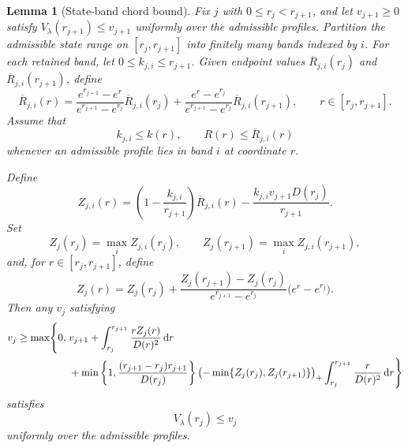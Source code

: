 \documentclass[11pt]{article}
\newtheorem{lemma}[theorem]{Lemma}
\theoremstyle{definition}
\theoremstyle{remark}
\newcommand{\dd}{\,\mathrm d}
\begin{document}
\begin{lemma}[State-band chord bound]
\label{lem:cert-dp-chord}
Fix $j$ with $0\le r_j<r_{j+1}$, and let $v_{j+1}\ge0$
satisfy $V_\lambda(r_{j+1})\le v_{j+1}$ uniformly over the
admissible profiles.  Partition the admissible state range on
$[r_j,r_{j+1}]$ into finitely many bands indexed by $i$.
For each retained band, let $0\le k_{j,i}\le r_{j+1}$.
Given endpoint values $\overline R_{j,i}(r_j)$ and
$\overline R_{j,i}(r_{j+1})$, define
\[
 \overline R_{j,i}(r)
 =\frac{e^{r_{j+1}}-e^r}{e^{r_{j+1}}-e^{r_j}}
   \overline R_{j,i}(r_j)
 +\frac{e^r-e^{r_j}}{e^{r_{j+1}}-e^{r_j}}
   \overline R_{j,i}(r_{j+1}),
 \qquad r\in[r_j,r_{j+1}].
\]
Assume that
\[
 k_{j,i}\le k(r),\qquad R(r)\le\overline R_{j,i}(r)
\]
whenever an admissible profile lies in band $i$ at coordinate $r$.

Define
\begin{equation}\label{eq:cert-generic-dp-chord}
 Z_{j,i}(r)
 =
 \left(1-\frac{k_{j,i}}{r_{j+1}}\right)
 \overline R_{j,i}(r)
 -
 \frac{k_{j,i}v_{j+1}D(r_j)}{r_{j+1}}.
\end{equation}
Set
\[
 Z_j(r_j)=\max_iZ_{j,i}(r_j),
 \qquad
 Z_j(r_{j+1})=\max_iZ_{j,i}(r_{j+1}),
\]
and, for $r\in[r_j,r_{j+1}]$, define
\[
 Z_j(r)
 =
 Z_j(r_j)
 +
 \frac{Z_j(r_{j+1})-Z_j(r_j)}
      {e^{r_{j+1}}-e^{r_j}}
 \bigl(e^r-e^{r_j}\bigr).
\]
Then any $v_j$ satisfying
\begin{align}
 v_j\ge\max\Biggl\{0,\;&
 v_{j+1}
 +\int_{r_j}^{r_{j+1}}
   \frac{rZ_j(r)}{D(r)^2}\dd r \notag\\
 &+
 \min\left\{
 1,\frac{(r_{j+1}-r_j)r_{j+1}}{D(r_j)}
 \right\}
 \bigl(-\min\{Z_j(r_j),Z_j(r_{j+1})\}\bigr)_+
 \int_{r_j}^{r_{j+1}}\frac r{D(r)^2}\dd r
 \Biggr\}
\label{eq:cert-generic-dp-update}
\end{align}
satisfies
\[
 V_\lambda(r_j)\le v_j
\]
uniformly over the admissible profiles.
\end{lemma}
\end{document}
